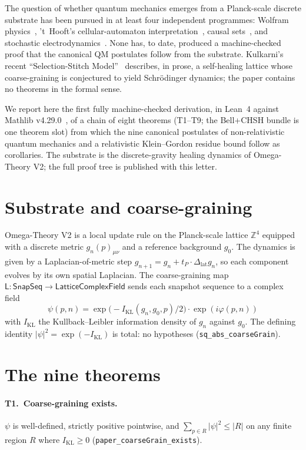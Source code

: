 \documentclass[aps,prl,twocolumn,superscriptaddress,nofootinbib,10pt]{revtex4-2}
\newcommand{\KL}{I_{\mathrm{KL}}}
\newcommand{\tP}{t_P}
\begin{document}
The question of whether quantum mechanics emerges from a
Planck-scale discrete substrate has been pursued in at least four
independent programmes: Wolfram physics~\cite{Wolfram2020},
't~Hooft's cellular-automaton
interpretation~\cite{tHooft2014,tHooft2016}, causal
sets~\cite{BombelliLeeMeyerSorkin1987}, and stochastic
electrodynamics~\cite{dePenaCetto1996}. None has, to date, produced
a machine-checked proof that the canonical QM postulates follow from
the substrate. Kulkarni's recent ``Selection-Stitch
Model''~\cite{Kulkarni2026} describes, in prose, a self-healing
lattice whose coarse-graining is conjectured to yield Schr\"odinger
dynamics; the paper contains no theorems in the formal sense.

We report here the first fully machine-checked derivation, in Lean~4
against Mathlib v4.29.0~\cite{Mathlib4}, of a chain of eight theorems
(T1--T9; the Bell+CHSH bundle is one theorem slot) from which the
nine canonical postulates of non-relativistic quantum mechanics and
a relativistic Klein--Gordon residue bound follow as corollaries. The
substrate is the discrete-gravity healing dynamics of Omega-Theory V2;
the full proof tree is published with this letter.

\section{Substrate and coarse-graining}

Omega-Theory V2 is a local update rule on the Planck-scale lattice
$\mathbb{Z}^{4}$ equipped with a discrete metric $g_{n}(p)_{\mu\nu}$
and a reference background $g_{0}$. The dynamics is given by a
Laplacian-of-metric step
$g_{n+1}=g_{n}+\tP\cdot\Delta_{\mathrm{lat}}g_{n}$, so each
component evolves by its own spatial Laplacian. The coarse-graining
map $\mathsf{L}:\mathsf{SnapSeq}\to\mathsf{LatticeComplexField}$
sends each snapshot sequence to a complex field
\[
\psi(p,n)=\exp\!\bigl(-\KL(g_{n},g_{0},p)/2\bigr)\cdot\exp(i\varphi(p,n))
\]
with $\KL$ the Kullback--Leibler information density of $g_{n}$
against $g_{0}$. The defining identity
$|\psi|^{2}=\exp(-\KL)$ is total: no hypotheses
(\texttt{sq\_abs\_coarseGrain}).

\section{The nine theorems}

\paragraph{T1.\ Coarse-graining exists.}
$\psi$ is well-defined, strictly positive pointwise, and
$\sum_{p\in R}|\psi|^{2}\le |R|$ on any finite region $R$ where
$\KL\ge 0$ (\texttt{paper\_coarseGrain\_exists}).
\end{document}
